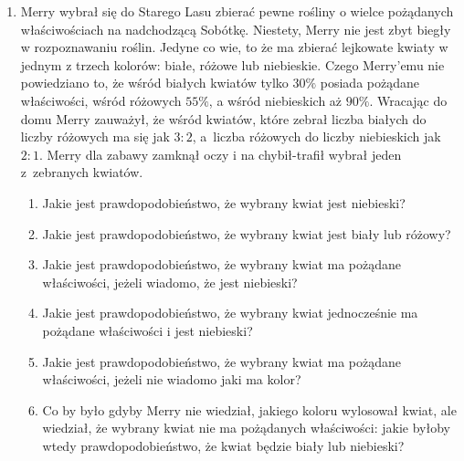 \documentclass[twoside]{mwart}
\newcommand{\ans}[1]{}
\newenvironment{ansenv}{\comment}{\endcomment}
\newenvironment{ansenv}{\paragraph{Odpowiedź:}}{}
\newcommand{\ans}[1]{\begin{ansenv}#1\end{ansenv}}
\begin{document}
\begin{enumerate}
\ans{
	Oznaczamy zdarzenia:
	\begin{itemize}
		\item $K$ element sklasyfikowany jako dobry
		\item $K'$ element sklasyfikowany jako zły
		\item $D$ element faktycznie dobry
		\item $D'$ element faktycznie zły
	\end{itemize}
	Odczytujemy prawdopodobieństwa z treści zadania i obliczamy prawdopodobieństwa zdarzeń przeciwnych:
	\begin{gather*}
		P(D)=0{,}9 \qquad P(D')=0{,}1 \\
		P(K|D')=0{,}05 \qquad P(K'|D')=0{,}95 \\
		P(K'|D)=0{,}02 \qquad P(K|D)=0{,}98
	\end{gather*}
	Mamy policzyć $P(D|K)$, a skoro znamy prawdopodobieństwa "w drugą stronę" (tj. np. $P(K|D)$), to korzystamy z tw. Bayesa:
	\begin{gather*}
		P(D|K)=  \frac{P(K|D)P(D)}{P(K)} = \frac{P(K|D)P(D)}{P(K|D)P(D)+P(K|D')P(D')} = 
		\frac{0{,}98\cdot 0{,}9}{0{,}98\cdot 0{,}9 + 0{,}05\cdot 0{,}1}=\frac{882}{887}
	\end{gather*}
} 

\item Merry wybrał się do Starego Lasu zbierać pewne rośliny o wielce pożądanych właściwościach na nadchodzącą Sobótkę.
Niestety, Merry nie jest zbyt biegły w rozpoznawaniu roślin.
Jedyne co wie, to że ma zbierać lejkowate kwiaty w jednym z trzech kolorów: białe, różowe lub niebieskie.
Czego Merry'emu nie powiedziano to, że wśród białych kwiatów tylko $30\%$ posiada pożądane właściwości, wśród różowych $55\%$, a wśród niebieskich
aż $90\%$.
Wracając do domu Merry zauważył, że wśród kwiatów, które zebrał liczba białych do liczby różowych ma się jak $3:2$, a~liczba różowych do
liczby niebieskich jak $2:1$. Merry dla zabawy zamknął oczy i na chybił-trafił wybrał jeden z~zebranych kwiatów.
 
\begin{enumerate}
	\item Jakie jest prawdopodobieństwo, że wybrany kwiat jest niebieski?
	\item Jakie jest prawdopodobieństwo, że wybrany kwiat jest biały lub różowy?
	\item Jakie jest prawdopodobieństwo, że wybrany kwiat ma pożądane właściwości, jeżeli wiadomo, że jest niebieski?
	\item Jakie jest prawdopodobieństwo, że wybrany kwiat jednocześnie ma pożądane właściwości i jest niebieski?
	\item Jakie jest prawdopodobieństwo, że wybrany kwiat ma pożądane właściwości, jeżeli nie wiadomo jaki ma kolor?
	\item Co by było gdyby Merry nie wiedział, jakiego koloru wylosował kwiat, ale wiedział, że wybrany kwiat nie ma pożądanych
		właściwości: jakie byłoby wtedy prawdopodobieństwo, że kwiat będzie biały lub niebieski?
\end{enumerate}


\end{enumerate}
\end{document}
